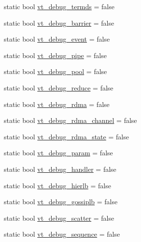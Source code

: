 \begin{DoxyCompactItemize}
\item 
static bool \hyperlink{structvt_1_1arguments_1_1_arg_config_abcc1685602fa86f685601ad4f65c422e}{vt\+\_\+debug\+\_\+termds} = false
\item 
static bool \hyperlink{structvt_1_1arguments_1_1_arg_config_aa521e854796aada164cd0316c48d8e23}{vt\+\_\+debug\+\_\+barrier} = false
\item 
static bool \hyperlink{structvt_1_1arguments_1_1_arg_config_a23460617fec839e7ae8d48427172b6c5}{vt\+\_\+debug\+\_\+event} = false
\item 
static bool \hyperlink{structvt_1_1arguments_1_1_arg_config_aba00af8a95c7fd6d41d08407a5fb33f1}{vt\+\_\+debug\+\_\+pipe} = false
\item 
static bool \hyperlink{structvt_1_1arguments_1_1_arg_config_a5fce7eff37704977022f2591d19471f8}{vt\+\_\+debug\+\_\+pool} = false
\item 
static bool \hyperlink{structvt_1_1arguments_1_1_arg_config_a6001b8760c0e1d53b0e55fc8c9de784e}{vt\+\_\+debug\+\_\+reduce} = false
\item 
static bool \hyperlink{structvt_1_1arguments_1_1_arg_config_a38e43be609c02e54398d44ceca1095fe}{vt\+\_\+debug\+\_\+rdma} = false
\item 
static bool \hyperlink{structvt_1_1arguments_1_1_arg_config_a78388ec62b79383eacf3e48b67a47a21}{vt\+\_\+debug\+\_\+rdma\+\_\+channel} = false
\item 
static bool \hyperlink{structvt_1_1arguments_1_1_arg_config_ade199a9171a20b108af3b3631f82e5d5}{vt\+\_\+debug\+\_\+rdma\+\_\+state} = false
\item 
static bool \hyperlink{structvt_1_1arguments_1_1_arg_config_a7a9c93ea8a341a22ff4d1e58c3543d17}{vt\+\_\+debug\+\_\+param} = false
\item 
static bool \hyperlink{structvt_1_1arguments_1_1_arg_config_aa2652f92547befd3f21fa9e7bf40bf94}{vt\+\_\+debug\+\_\+handler} = false
\item 
static bool \hyperlink{structvt_1_1arguments_1_1_arg_config_a427c7fec8f7075a40014f1e6e65f849b}{vt\+\_\+debug\+\_\+hierlb} = false
\item 
static bool \hyperlink{structvt_1_1arguments_1_1_arg_config_ad7a74adc5ab27891aee08a53e0bade6a}{vt\+\_\+debug\+\_\+gossiplb} = false
\item 
static bool \hyperlink{structvt_1_1arguments_1_1_arg_config_a7f07188c6e8a456e9bfdad9ced6159df}{vt\+\_\+debug\+\_\+scatter} = false
\item 
static bool \hyperlink{structvt_1_1arguments_1_1_arg_config_a871a494f26456713e0e3a2d66d9ed08d}{vt\+\_\+debug\+\_\+sequence} = false

\end{DoxyCompactItemize}
